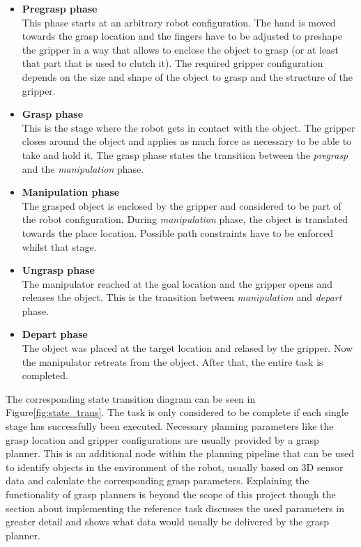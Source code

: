 \begin{itemize}

\item \textbf{Pregrasp phase} \\

This phase starts at an arbitrary robot configuration. The hand is moved towards the grasp location and the fingers have to be adjusted to preshape the gripper in a way that allows to enclose the object to grasp (or at least that part that is used to clutch it). The required gripper configuration depends on the size and shape of the object to grasp and the structure of the gripper.

\item \textbf{Grasp phase} \\

This is the stage where the robot gets in contact with the object. The gripper closes around the object and applies as much force as necessary to be able to take and hold it. The grasp phase states the transition between the \emph{pregrasp} and the \emph{manipulation} phase.

\item \textbf{Manipulation phase} \\

The grasped object is enclosed by the gripper and considered to be part of the robot configuration. 
During \emph{manipulation} phase, the object is translated towards the place location. Possible path constraints have to be enforced whilst that stage.

\item \textbf{Ungrasp phase} \\

The manipulator reached at the goal location and the gripper opens and releases the object. This is the transition between \emph{manipulation} and \emph{depart} phase.

\item \textbf{Depart phase} \\

The object was placed at the target location and relased by the gripper. Now the manipulator retreats from the object. After that, the entire task is completed.

\end{itemize}

The corresponding state transition diagram can be seen in Figure\ref{fig:state_trans}. The task is only considered to be complete if each single stage has successfully been executed. Necessary planning parameters like the grasp location and gripper configurations are usually provided by a grasp planner. This is an additional node within the planning pipeline that can be used to identify objects in the environment of the robot, usually based on 3D sensor data and calculate the corresponding grasp parameters. Explaining the functionality of grasp planners is beyond the scope of this project though the section about implementing the reference task discusses the used parameters in greater detail and shows what data would usually be delivered by the grasp planner. \\

